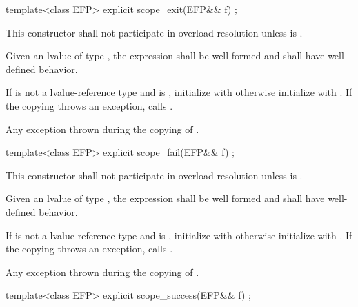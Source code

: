 \documentclass[ebook,11pt,article]{memoir}
\begin{document}
\begin{itemdecl}
template<class EFP>
explicit
scope_exit(EFP&& f) ;
\end{itemdecl}

\begin{itemdescr}
\remarks This constructor shall not participate in overload resolution unless  is .

\pnum
\requires Given an lvalue  of type , the expression  shall be well formed and shall have well-defined behavior.


\pnum
\effects If  is not a lvalue-reference type and  is , initialize   with  otherwise initialize  with . If the copying throws an exception, calls .

\pnum
\throws Any exception thrown during the copying of .

\end{itemdescr}


\begin{itemdecl}
template<class EFP>
explicit
scope_fail(EFP&& f) ;
\end{itemdecl}

\begin{itemdescr}
\pnum
\remarks This constructor shall not participate in overload resolution unless  is .

\pnum
\requires Given an lvalue  of type , the expression  shall be well formed and shall have well-defined behavior.

\pnum
\effects If  is not a lvalue-reference type and  is , initialize   with  otherwise initialize  with . If the copying throws an exception, calls .

\pnum
\throws Any exception thrown during the copying of .

\end{itemdescr}

\begin{itemdecl}
template<class EFP>
explicit
scope_success(EFP&& f) ;
\end{itemdecl}
\end{document}
